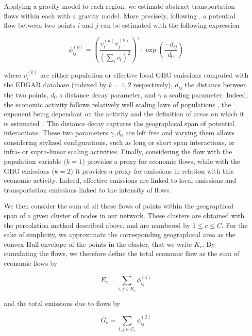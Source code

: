 \documentclass{jimis-en}
\begin{document}
Applying a gravity model to each region, we estimate abstract transportation flows within each with a gravity model. More precisely, following \cite{raimbault2018indirect}, a potential flow between two points $i$ and $j$ can be estimated with the following expression 

\begin{equation}
\phi_{ij}^{(k)} = \left(\frac{v^{(k)}_i v^{(k)}_j}{(\sum_l v_l)^2}\right)^\gamma \cdot \exp\left(\frac{-d_{ij}}{d_0}\right)
\end{equation}

where $v^{(k)}_i$ are either population or effective local GHG emissions computed with the EDGAR database (indexed by $k = 1,2$ respectively), $d_{ij}$ the distance between the two points, $d_0$ a distance decay parameter, and $\gamma$ a scaling parameter. Indeed, the economic activity follows relatively well scaling laws of populations \citep{bettencourt2007growth}, the exponent being dependant on the activity and the definition of areas on which it is estimated~\citep{cottineau2017diverse}. The distance decay captures the geographical span of potential interactions. These two parameters $\gamma,d_0$ are left free and varying them allows considering stylized configurations, such as long or short span interactions, or infra- or supra-linear scaling activities. Finally, considering the flow with the population variable ($k=1$) provides a proxy for economic flows, while with the GHG emissions ($k=2$) it provides a proxy for emissions in relation with this economic activity. Indeed, effective emissions are linked to local emissions and transportation emissions linked to the intensity of flows.

We then consider the sum of all these flows of points within the geographical span of a given cluster of nodes in our network. These clusters are obtained with the percolation method described above, and are numbered by $1 \leq c \leq C$. For the sake of simplicity, we approximate the corresponding geographical area as the convex Hull envelope of the points in the cluster, that we write $K_c$. By cumulating the flows, we therefore define the total economic flow as the sum of economic flows by 

\begin{equation}
E_c = \sum_{i,j \in K_c} \phi_{ij}^{(1)}
\end{equation}

and the total emissions due to flows by

\begin{equation}
G_c = \sum_{i,j \in C_c} \phi_{ij}^{(2)}
\end{equation}
\end{document}
